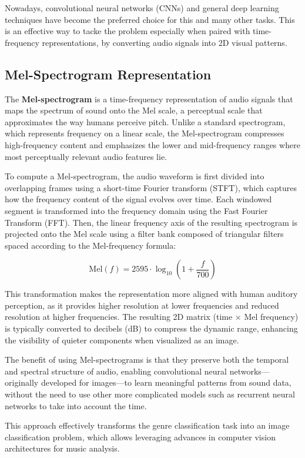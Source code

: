 \documentclass[a4paper,12pt]{article}
\begin{document}
Nowadays, convolutional neural networks (CNNs) and general deep learning techniques have become the preferred choice for this and many other tasks. This is an effective way to tacke the problem especially when paired with time-frequency representations, by converting audio signals into 2D visual patterns.

\subsection{Mel-Spectrogram Representation}

The \textbf{Mel-spectrogram} is a time-frequency representation of audio signals that maps the spectrum of sound onto the Mel scale, a perceptual scale that approximates the way humans perceive pitch. Unlike a standard spectrogram, which represents frequency on a linear scale, the Mel-spectrogram compresses high-frequency content and emphasizes the lower and mid-frequency ranges where most perceptually relevant audio features lie.

To compute a Mel-spectrogram, the audio waveform is first divided into overlapping frames using a short-time Fourier transform (STFT), which captures how the frequency content of the signal evolves over time. Each windowed segment is transformed into the frequency domain using the Fast Fourier Transform (FFT). Then, the linear frequency axis of the resulting spectrogram is projected onto the Mel scale using a filter bank composed of triangular filters spaced according to the Mel-frequency formula:

\[
\text{Mel}(f) = 2595 \cdot \log_{10}\left(1 + \frac{f}{700}\right)
\]

This transformation makes the representation more aligned with human auditory perception, as it provides higher resolution at lower frequencies and reduced resolution at higher frequencies. The resulting 2D matrix (time $\times$ Mel frequency) is typically converted to decibels (dB) to compress the dynamic range, enhancing the visibility of quieter components when visualized as an image.

The benefit of using Mel-spectrograms is that they preserve both the temporal and spectral structure of audio, enabling convolutional neural networks—originally developed for images—to learn meaningful patterns from sound data, without the need to use other more complicated models such as recurrent neural networks to take into account the time.

This approach effectively transforms the genre classification task into an image classification problem, which allows leveraging advances in computer vision architectures for music analysis.
\end{document}
